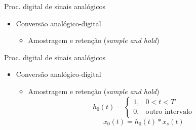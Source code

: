 \begin{slide}{Proc. digital de sinais anal\'ogicos}
\begin{itemize}
   \item Conversão analógico-digital
   \begin{itemize}
      \item Amostragem e retenção (\emph{sample and hold})
      \begin{figure}
         \centering
      \end{figure}

   \end{itemize}
\end{itemize}
\end{slide}

\begin{slide}{Proc. digital de sinais anal\'ogicos}
\begin{itemize}
   \item Conversão analógico-digital
   \begin{itemize}
      \item Amostragem e retenção (\emph{sample and hold})
      \begin{equation}
          h_0(t) = \begin{cases} 1, & 0<t<T\\0, & \text{outro intervalo}\end{cases}
      \end{equation}
      \begin{equation}
          x_0(t) = h_0(t)\ast x_s(t)
      \end{equation}
   \end{itemize}
\end{itemize}
\end{slide}

